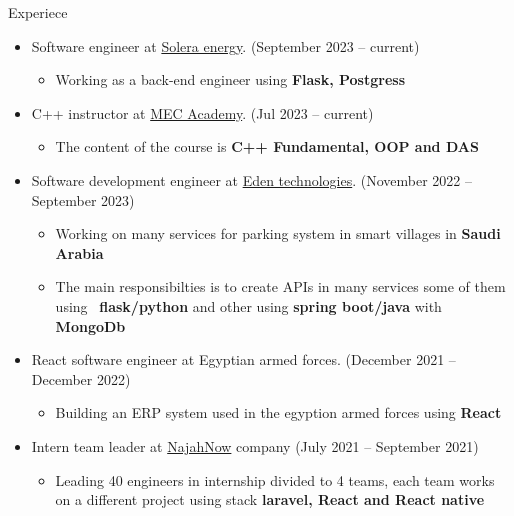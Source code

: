 \documentclass{resume}
\begin{document}
\begin{rSection}{Experiece}
  \begin{itemize}
    \item Software engineer at \href{https://www.linkedin.com/company/solera-llc/mycompany/verification/}{Solera energy}. \hfill{(September 2023 – current)}
          \begin{itemize}
            \item Working as a back-end engineer using \textbf{Flask, Postgress}
          \end{itemize}

    \item C++ instructor at \href{https://web.facebook.com/mecacademyegy}{MEC Academy}. \hfill{(Jul 2023 – current)}
          \begin{itemize}
            \item The content of the course is \textbf{C++ Fundamental, OOP and DAS}
          \end{itemize}
    
    \item Software development engineer at \href{https://www.linkedin.com/company/edentech2/mycompany/}{Eden technologies}. \hfill{(November 2022 – September 2023)}
          \begin{itemize}
            \item Working on many services for parking system in smart villages in \textbf{Saudi Arabia}
            \item The main responsibilties is to create APIs in many services some of them using \
              \textbf{flask/python} and other using \textbf{spring boot/java} with \textbf{MongoDb}
          \end{itemize}
    \item React software engineer at Egyptian armed forces. \hfill{(December 2021 – December 2022)}
    \begin{itemize}
      \item Building an ERP system used in the egyption armed forces using \textbf{React}
    \end{itemize}
    \item Intern team leader at \href{https://najahnow.net}{NajahNow} company \hfill{(July 2021 – September 2021)}
          \begin{itemize}
            \item Leading 40 engineers in internship divided to 4 teams, 
            each team works on a different project using stack \textbf{laravel, React and React native}
          \end{itemize}


\end{itemize}
\end{rSection}
\end{document}
